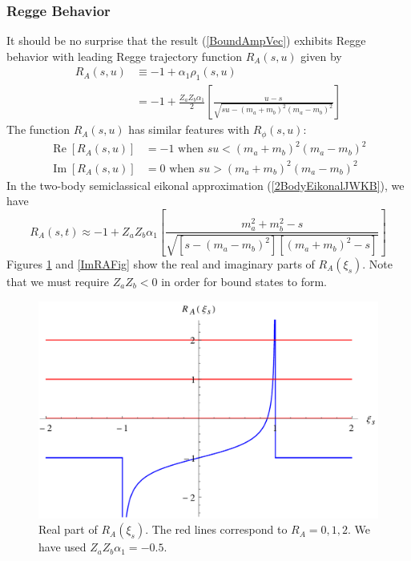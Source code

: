 \subsubsection{Regge Behavior}
It should be no surprise that the result (\ref{BoundAmpVec}) exhibits Regge behavior with leading Regge trajectory function $R_{A}(s, u)$ given by
\begin{align}
	R_{A}(s, u) &\equiv -1 + \alpha_{1} \rho_{1}(s, u) \nonumber \\
	&= -1 + \frac{Z_{a} Z_{b} \alpha_{1}}{2} \left[ \frac{u - s}{\sqrt{s u - (m_{a} + m_{b})^{2} (m_{a} - m_{b})^{2}}} \right]
\end{align}
The function $R_{A}(s, u)$ has similar features with $R_{\phi}(s, u)$:
\begin{equation}
\begin{split}
	\operatorname{Re}{[R_{A}(s, u)]} &= -1 \text{ when } s u < (m_{a} + m_{b})^{2} (m_{a} - m_{b})^{2} \\
	\operatorname{Im}{[R_{A}(s, u)]} &= 0 \text{ when } s u > (m_{a} + m_{b})^{2} (m_{a} - m_{b})^{2}
\end{split}
\end{equation}
In the two-body semiclassical eikonal approximation (\ref{2BodyEikonalJWKB}), we have
\begin{equation}
	R_{A}(s, t) \approx -1 + Z_{a} Z_{b} \alpha_{1} \left[ \frac{m_{a}^{2} + m_{b}^{2} - s}{\sqrt{[s - (m_{a} - m_{b})^{2}] [(m_{a} + m_{b})^{2} - s]}} \right]
\end{equation}
Figures \ref{ReRAFig} and \ref{ImRAFig} show the real and imaginary parts of $R_{A}(\xi_{s})$. Note that we must require $Z_{a} Z_{b} < 0$ in order for bound states to form.

\begin{figure}
\centering
\includegraphics[scale=0.6]{Plots/ReRA.pdf}
\caption[Real part of the Regge trajectory function for the massless vector exchange model]{Real part of $R_{A}(\xi_{s})$. The red lines correspond to $R_{A} = 0, 1, 2$. We have used $Z_{a} Z_{b} \alpha_{1} = -0.5$.}
\label{ReRAFig}
\end{figure}

